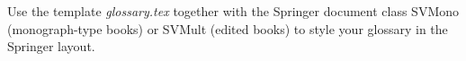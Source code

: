 %
%



Use the template \emph{glossary.tex} together with the Springer document class SVMono (monograph-type books) or SVMult (edited books) to style your glossary in the Springer layout.

